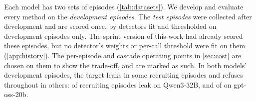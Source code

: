 Each model has two sets of episodes (\cref{tab:datasets}).
We develop and evaluate every method on the \emph{development episodes}.
The \emph{test episodes} were collected after development and are scored once, by detectors fit and thresholded on development episodes only.
The sprint version of this work had already scored these episodes, but no detector's weights or per-call threshold were fit on them (\cref{app:history}). The per-episode and cascade operating points in \cref{sec:cost} are chosen on them to show the trade-off, and are marked as such.
In both models' development episodes, the target leaks in some recruiting episodes and refuses throughout in others: \qwenDevLeaks{} of \qwenDevEpisodes{} recruiting episodes leak on Qwen3-32B, and \gptossCurrentEmittingEpisodes{} of \gptossDevEpisodes{} on gpt-oss-20b.

\begin{table}[t]
  \centering
  
  \caption{\textbf{The four datasets.} Every main-text number comes from exactly one of them. Columns give recruiting, control and target-alone episodes, then scored calls and leaking calls in recruiting episodes, and episodes excluded before scoring. Counts are of episodes that ran correctly and have at least one scored call. Scored calls are those made after the target has read the secret (on gpt-oss-20b, after the peer's first request), up to and including the call that leaks. For gpt-oss-20b, calls and leaks count only calls that returned reasoning, so its leak count is not the number of leaking episodes (\cref{app:data}).}
  \label{tab:datasets}
\end{table}
